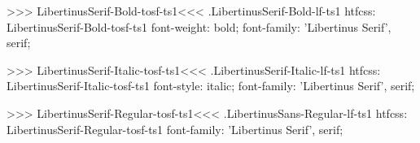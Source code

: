 {{{{>>>
\<LibertinusSerif-Bold-tosf-ts1\><<<
.LibertinusSerif-Bold-lf-ts1
htfcss:  LibertinusSerif-Bold-tosf-ts1  font-weight: bold; font-family: 'Libertinus Serif', serif;

>>>
\<LibertinusSerif-Italic-tosf-ts1\><<<
.LibertinusSerif-Italic-lf-ts1
htfcss:  LibertinusSerif-Italic-tosf-ts1  font-style: italic; font-family: 'Libertinus Serif', serif;

>>>
\<LibertinusSerif-Regular-tosf-ts1\><<<
.LibertinusSans-Regular-lf-ts1
htfcss:  LibertinusSerif-Regular-tosf-ts1  font-family: 'Libertinus Serif', serif;

}}}}
